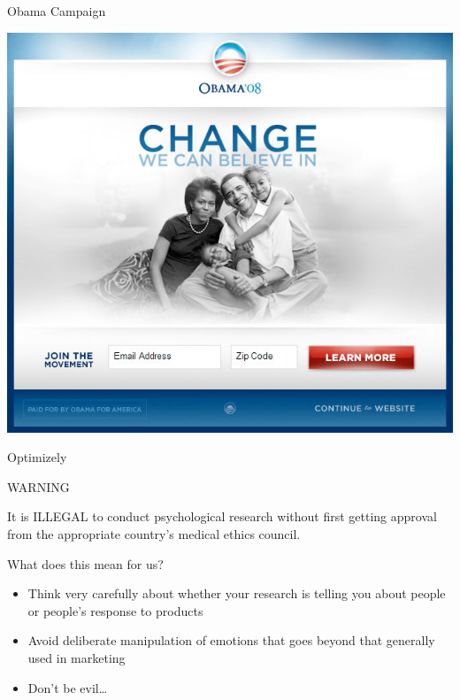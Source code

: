 \documentclass{beamer}
\begin{document}
\begin{frame}{Obama Campaign}

\begin{center}
\includegraphics[scale=0.35]{pics/wk6/Obama_winner.png}
\end{center}

Optimizely

\end{frame}



\begin{frame}{WARNING}

It is ILLEGAL to conduct psychological research without first getting approval from the appropriate country's medical ethics council.

\vspace{5mm}

What does this mean for us?  
\begin{itemize}
\item Think very carefully about whether your research is telling you about people or people's response to products
\item Avoid deliberate manipulation of emotions that goes beyond that generally used in marketing
\item Don't be evil\ldots
\end{itemize}

\end{frame}
\end{document}
